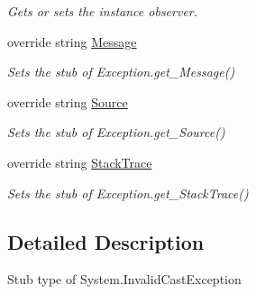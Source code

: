 \begin{DoxyCompactItemize}
\begin{DoxyCompactList}\small\item\em Gets or sets the instance observer.\end{DoxyCompactList}\item 
override string \hyperlink{class_system_1_1_fakes_1_1_stub_invalid_cast_exception_a88c6abb4c17a40240c80f648facbbc81}{Message}
\begin{DoxyCompactList}\small\item\em Sets the stub of Exception.\-get\-\_\-\-Message()\end{DoxyCompactList}\item 
override string \hyperlink{class_system_1_1_fakes_1_1_stub_invalid_cast_exception_acc8cf93e3a1647585132bb0add3cec29}{Source}
\begin{DoxyCompactList}\small\item\em Sets the stub of Exception.\-get\-\_\-\-Source()\end{DoxyCompactList}\item 
override string \hyperlink{class_system_1_1_fakes_1_1_stub_invalid_cast_exception_a4fe8fc893dbfa36e8572918658952d54}{Stack\-Trace}
\begin{DoxyCompactList}\small\item\em Sets the stub of Exception.\-get\-\_\-\-Stack\-Trace()\end{DoxyCompactList}\end{DoxyCompactItemize}


\subsection{Detailed Description}
Stub type of System.\-Invalid\-Cast\-Exception



